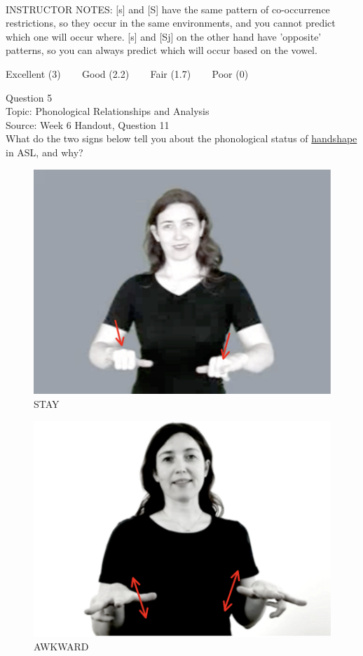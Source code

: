 \documentclass[12pt]{article}
\begin{document}
~\\
INSTRUCTOR NOTES: [s] and [S] have the same pattern of co-occurrence restrictions, so they occur in the same environments, and you cannot predict which one will occur where. [s] and [Sj] on the other hand have 'opposite' patterns, so you can always predict which will occur based on the vowel.


\vfill
Excellent (3) ~~~ Good (2.2) ~~~ Fair (1.7) ~~~ Poor (0)
\newpage

{\large Question 5}\\

Topic: Phonological Relationships and Analysis\\
Source: Week 6 Handout, Question 11\\

What do the two signs below tell you about the phonological status of \underline{handshape} in ASL, and why?\\

\begin{figure}[H]
\includegraphics{../images/asl_stay.png}
\caption{STAY}
\end{figure}
\begin{figure}[H]
\includegraphics{../images/asl_awkward.png}
\caption{AWKWARD}
\end{figure}
\end{document}
